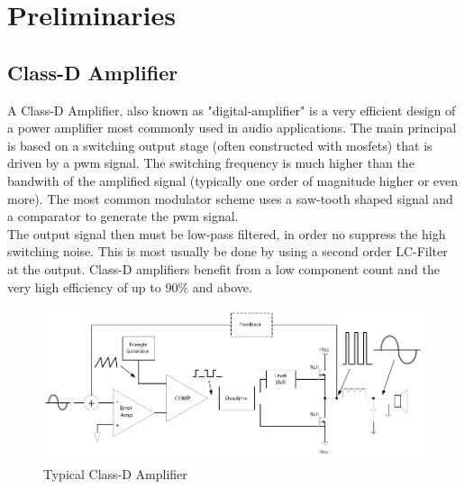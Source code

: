 \chapter{Preliminaries}
\section{Class-D Amplifier}
A Class-D Amplifier, also known as "digital-amplifier" is a very efficient design of a power amplifier most commonly used in audio applications. The main principal is based on a switching output stage (often constructed with \acrshort{mosfet}s) that is driven by a \acrfull{pwm} signal. The switching frequency is much higher than the bandwith of the amplified signal (typically one order of magnitude higher or even more). The most common modulator scheme uses a saw-tooth shaped signal and a comparator to generate the \acrshort{pwm} signal.\\
The output signal then must be low-pass filtered, in order no suppress the high switching noise. This is most usually be done by using a second order LC-Filter at the output. Class-D amplifiers benefit from a low component count and the very high efficiency of up to 90\% and above.

\begin{figure}[h!]
	\centering
	\includegraphics[width=\textwidth]{images/2_Preliminaries/Class-D Amplifier.pdf}
	\vspace{-0.2cm}
    \caption{Typical Class-D Amplifier \cite{analog_class_d_Basics}}
    \label{fig:class_d_amplifier}
\end{figure}
\newpage

